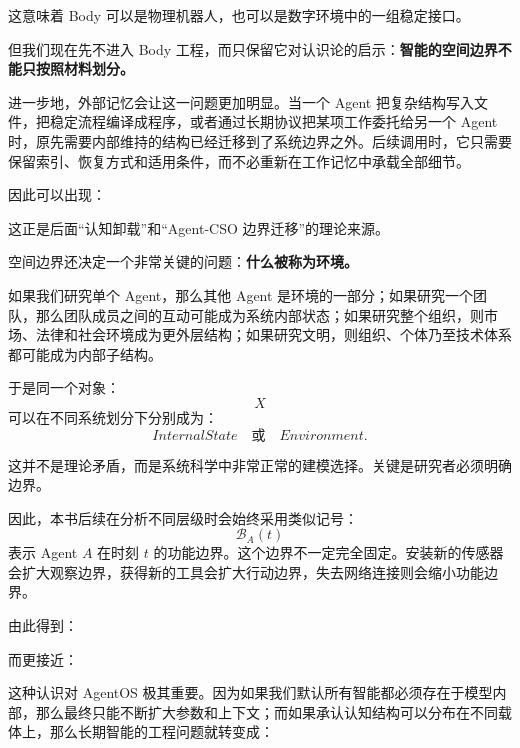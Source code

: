 这意味着 Body 可以是物理机器人，也可以是数字环境中的一组稳定接口。

但我们现在先不进入 Body 工程，而只保留它对认识论的启示：\textbf{智能的空间边界不能只按照材料划分。}

进一步地，外部记忆会让这一问题更加明显。当一个 Agent 把复杂结构写入文件，把稳定流程编译成程序，或者通过长期协议把某项工作委托给另一个 Agent 时，原先需要内部维持的结构已经迁移到了系统边界之外。后续调用时，它只需要保留索引、恢复方式和适用条件，而不必重新在工作记忆中承载全部细节。

因此可以出现：
\begin{statementbox}
\centering
{}
\end{statementbox}

这正是后面“认知卸载”和“Agent-CSO 边界迁移”的理论来源。

空间边界还决定一个非常关键的问题：\textbf{什么被称为环境。}

如果我们研究单个 Agent，那么其他 Agent 是环境的一部分；如果研究一个团队，那么团队成员之间的互动可能成为系统内部状态；如果研究整个组织，则市场、法律和社会环境成为更外层结构；如果研究文明，则组织、个体乃至技术体系都可能成为内部子结构。

于是同一个对象：
\[
X
\]
可以在不同系统划分下分别成为：
\[
InternalState
\quad\text{或}\quad
Environment.
\]

这并不是理论矛盾，而是系统科学中非常正常的建模选择。关键是研究者必须明确边界。

因此，本书后续在分析不同层级时会始终采用类似记号：
\[
\mathcal B_A(t)
\]
表示 Agent \(A\) 在时刻 \(t\) 的功能边界。这个边界不一定完全固定。安装新的传感器会扩大观察边界，获得新的工具会扩大行动边界，失去网络连接则会缩小功能边界。

由此得到：
\begin{statementbox}
\centering
{}
\end{statementbox}
而更接近：
\begin{statementbox}
\centering
{}
\end{statementbox}

这种认识对 AgentOS 极其重要。因为如果我们默认所有智能都必须存在于模型内部，那么最终只能不断扩大参数和上下文；而如果承认认知结构可以分布在不同载体上，那么长期智能的工程问题就转变成：

